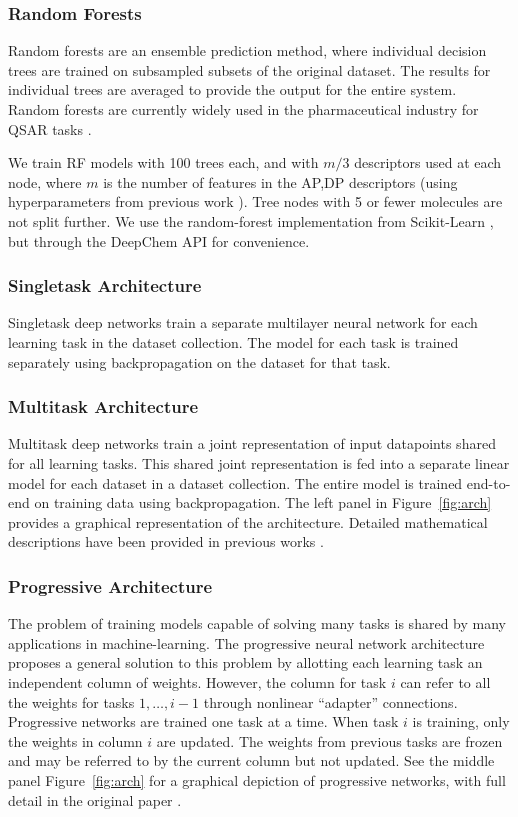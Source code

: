 \subsubsection{Random Forests}
Random forests \cite{breiman2001random} are an ensemble prediction method, where individual decision trees are trained on subsampled subsets of the original dataset. The results for individual trees are averaged to provide the output for the entire system. Random forests are currently widely used in the pharmaceutical industry for QSAR tasks \cite{svetnik2003random}.

We train RF models with 100 trees each, and with
$m/3$ descriptors used at each node, where $m$ is the
number of features in the AP,DP descriptors (using hyperparameters from previous work \cite{ma2015deep}). Tree nodes with 5 or fewer molecules are not split further.  We use the random-forest implementation from Scikit-Learn \cite{pedregosa2011scikit}, but through the DeepChem API for convenience.

\subsubsection{Singletask Architecture}

Singletask deep networks train a separate multilayer neural network for each learning task in the dataset collection. The model for each task is trained separately using backpropagation on the dataset for that task.

\subsubsection{Multitask Architecture}
Multitask deep networks train a joint representation of input datapoints shared for all learning tasks. This shared joint representation is fed into a separate linear model for each dataset in a dataset collection. The entire model is trained end-to-end on training data using backpropagation. The left panel in Figure~\ref{fig:arch} provides a graphical representation of the architecture. Detailed mathematical descriptions have been provided in previous works \cite{ma2015deep, ramsundar2015massively}.

\subsubsection{Progressive Architecture}
The problem of training models capable of solving many tasks is shared by many applications in machine-learning. The progressive neural network architecture \cite{rusu2016progressive} proposes a general solution to this problem by allotting each learning task an independent column of weights. However, the column for task $i$ can refer to all the weights for tasks $1,\dotsc, i-1$ through nonlinear ``adapter'' connections. Progressive networks are trained one task at a time. When task $i$ is training, only the weights in column $i$ are updated. The weights from previous tasks are frozen and may be referred to by the current column but not updated. See the middle panel Figure~\ref{fig:arch} for a graphical depiction of progressive networks, with full detail in the original paper \cite{rusu2016progressive}.

